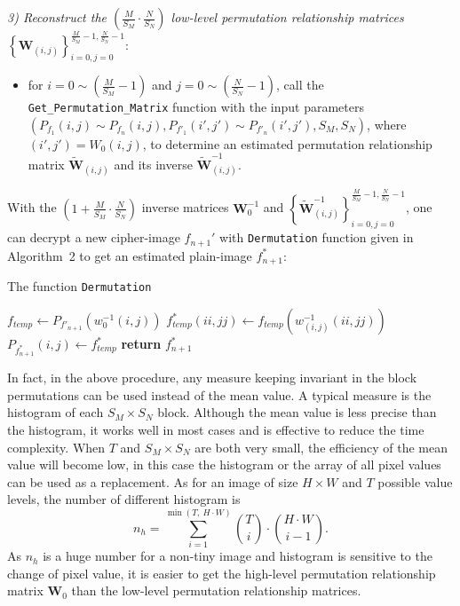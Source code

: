 \documentclass[final,3p,times,twocolumn]{elsarticle}
\begin{document}
\textit{3) \textit{Reconstruct the
$\left(\frac{M}{S_M}\cdot\frac{N}{S_N}\right)$ low-level
permutation relationship matrices
$\left\{\bm{W}_{(i,j)}\right\}_{i=0,j=0}^{\frac{M}{S_M}-1,\frac{N}{S_N}-1}$}}:
\begin{itemize}
\item for $i=0\sim\left(\frac{M}{S_M}-1\right)$ and
$j=0\sim\left(\frac{N}{S_N}-1\right)$, call the
\texttt{Get\_Permutation\_Matrix} function with the input
parameters $(P_{f_1}(i,j)\sim P_{f_n}(i,j), P_{f'_1}(i',j')\sim
P_{f'_n}(i',j'), S_M, S_N)$, where $(i',j')=W_0(i,j)$, to
determine an estimated permutation relationship matrix
$\widetilde{\bm{W}}_{(i,j)}$ and its inverse
$\widetilde{\bm{W}}_{(i,j)}^{-1}$.
\end{itemize}

With the $\left(1+\frac{M}{S_M}\cdot\frac{N}{S_N}\right)$ inverse
matrices $\bm{W}_0^{-1}$ and
$\left\{\widetilde{\bm{W}}_{(i,j)}^{-1}\right\}_{i=0,j=0}^{\frac{M}{S_M}-1,\frac{N}{S_N}-1}$,
one can decrypt a new cipher-image $f_{n+1}'$ with \texttt{Dermutation} function
given in Algorithm~2 to get an estimated plain-image $f_{n+1}^*$:
\begin{algorithm}
\caption{The function \texttt{Dermutation}}
\begin{algorithmic}[1]
     \State $f_{temp} \leftarrow P_{f'_{n+1}}(w_0^{-1}(i,j))$
              \State $f_{temp}^*(ii,jj)\leftarrow f_{temp}\left(w_{(i,j)}^{-1}(ii,jj)\right)$
              \State $P_{f_{n+1}^*}(i,j)\leftarrow f_{temp}^*$
            \EndFor
      \EndFor
  \EndFor
\EndFor
\State \textbf{return} $f_{n+1}^*$
\EndFunction
\end{algorithmic}
\end{algorithm}

In fact, in the above procedure, any measure keeping invariant in
the block permutations can be used instead of the mean value. A
typical measure is the histogram of each $S_M\times S_N$ block.
Although the mean value is less precise than the histogram, it
works well in most cases and is effective to reduce the time
complexity. When $T$ and $S_M\times S_N$ are both very small, the
efficiency of the mean value will become low, in this case the histogram or
the array of all pixel values can be used as a replacement.
As for an image of size $H\times W$ and $T$ possible value levels,
the number of different histogram is
\begin{equation}
n_h=\sum_{i=1}^{\min(T,\ H\cdot W)} {T\choose i}\cdot {H\cdot W\choose i-1}.
\end{equation}
As $n_h$ is a huge number for a non-tiny image and histogram is sensitive to the change of pixel value, it is easier to get the high-level
permutation relationship matrix $\bm{W}_0$ than the low-level permutation relationship matrices.
\end{document}
